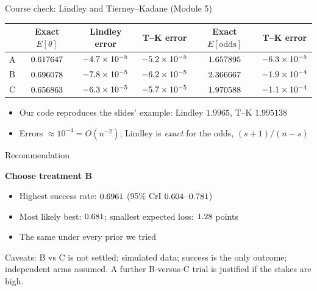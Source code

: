 \documentclass[aspectratio=169,11pt]{beamer}
\newcommand{\headline}[1]{{\Huge\bfseries #1}}
\begin{document}
\begin{frame}{Course check: Lindley and Tierney--Kadane (Module 5)}
\small
\begin{tabular}{lccccc}
\toprule
 & Exact $E[\theta]$ & Lindley error & T--K error & Exact $E[\text{odds}]$ & T--K error\\
\midrule
A & $0.617647$ & $-4.7\times 10^{-5}$ & $-5.2\times 10^{-5}$ & $1.657895$ & $-6.3\times 10^{-5}$\\
B & $0.696078$ & $-7.8\times 10^{-5}$ & $-6.2\times 10^{-5}$ & $2.366667$ & $-1.9\times 10^{-4}$\\
C & $0.656863$ & $-6.3\times 10^{-5}$ & $-5.7\times 10^{-5}$ & $1.970588$ & $-1.1\times 10^{-4}$\\
\bottomrule
\end{tabular}
\normalsize
\begin{itemize}
\item Our code reproduces the slides' example: Lindley $1.9965$, T--K $1.995138$
\item Errors $\approx10^{-4}=O(n^{-2})$; Lindley is \emph{exact} for the odds, $(s+1)/(n-s)$
\end{itemize}
\end{frame}

\begin{frame}{Recommendation}
\begin{center}
\headline{Choose treatment \textcolor{tB}{B}}
\end{center}
\vspace{0.4em}
\begin{itemize}
\item Highest success rate: $0.6961$ (95\% CrI $0.604$--$0.781$)
\item Most likely best: $0.681$; smallest expected loss: $1.28$ points
\item The same under every prior we tried
\end{itemize}
\vspace{0.3em}
\textcolor{ink2}{\small Caveats: B vs C is not settled; simulated data; success is the only outcome;
independent arms assumed. A further B-versus-C trial is justified if the stakes are high.}
\end{frame}
\end{document}

